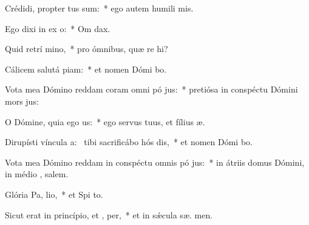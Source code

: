 \item Crédidi, propter  tus sum:~* ego autem humili  mis.
\item Ego dixi in ex o:~* Om  dax.
\item Quid retrí mino,~* pro ómnibus, quæ re hi?
\item Cálicem salutá piam:~* et nomen Dómi bo.
\item Vota mea Dómino reddam coram omni pó jus:~* pretiósa in conspéctu Dómini mors  jus:
\item O Dómine, quia ego  us:~* ego servus tuus, et fílius  æ.
\item Dirupísti víncula a:~\pscross{} tibi sacrificábo hós dis,~* et nomen Dómi bo.
\item Vota mea Dómino reddam in conspéctu omnis pó jus:~* in átriis domus Dómini, in médio , salem.
\item Glória Pa,  lio,~* et Spi to.
\item Sicut erat in princípio, et ,  per,~* et in sǽcula sæ. men.

